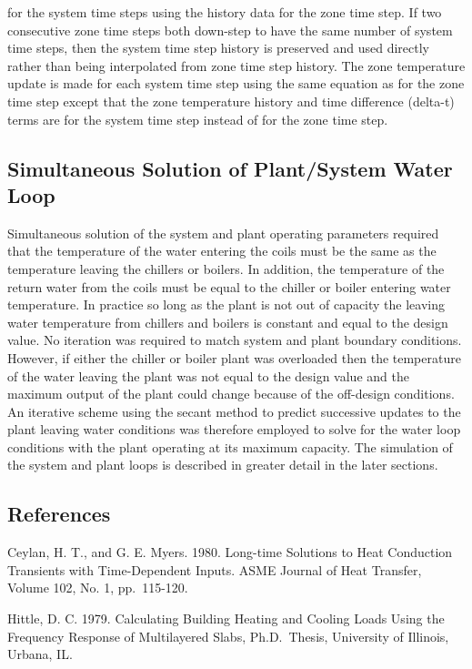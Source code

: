for the system time steps using the history data for the zone time step. If two consecutive zone time steps both down-step to have the same number of system time steps, then the system time step history is preserved and used directly rather than being interpolated from zone time step history. The zone temperature update is made for each system time step using the same equation as for the zone time step except that the zone temperature history and time difference (delta-t) terms are for the system time step instead of for the zone time step.

\subsection{Simultaneous Solution of Plant/System Water Loop}\label{simultaneous-solution-of-plantsystem-water-loop}

Simultaneous solution of the system and plant operating parameters required that the temperature of the water entering the coils must be the same as the temperature leaving the chillers or boilers. In addition, the temperature of the return water from the coils must be equal to the chiller or boiler entering water temperature. In practice so long as the plant is not out of capacity the leaving water temperature from chillers and boilers is constant and equal to the design value. No iteration was required to match system and plant boundary conditions. However, if either the chiller or boiler plant was overloaded then the temperature of the water leaving the plant was not equal to the design value and the maximum output of the plant could change because of the off-design conditions. An iterative scheme using the secant method to predict successive updates to the plant leaving water conditions was therefore employed to solve for the water loop conditions with the plant operating at its maximum capacity. The simulation of the system and plant loops is described in greater detail in the later sections.

\subsection{References}\label{references-043}

Ceylan, H. T., and G. E. Myers. 1980. Long-time Solutions to Heat Conduction Transients with Time-Dependent Inputs. ASME Journal of Heat Transfer, Volume 102, No. 1, pp.~115-120.

Hittle, D. C. 1979. Calculating Building Heating and Cooling Loads Using the Frequency Response of Multilayered Slabs, Ph.D.~Thesis, University of Illinois, Urbana, IL.

